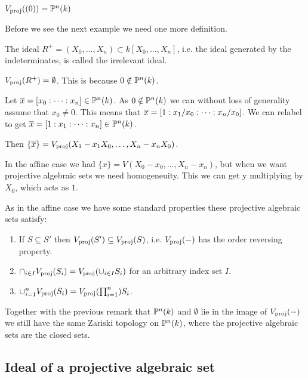 \begin{example}
$\Vp((0)) = \P^n(k)$
\end{example}

Before we see the next example we need one more definition. 

\begin{definition}
The ideal $R^+ = (X_0, \ldots, X_n) \subset k[X_0, \ldots, X_n]$, i.e. the ideal generated by the indeterminates, is called the irrelevant ideal. 
\end{definition}

\begin{example}
$\Vp(R^+) = \emptyset$. This is because $0\notin \P^n(k)$. 
\end{example}

\begin{example}
Let $\x = [x_0:\cdots:x_n] \in \P^n(k)$. As $0\notin \P^n(k)$ we can without loss of generality assume that $x_0 \neq 0$. This means that $\x=[1:x_1/x_0:\cdots:x_n/x_0]$. We can relabel to get $\x=[1:x_1:\cdots:x_n]\in \P^n(k)$. 

Then $\{\x\} = \Vp(X_1-x_1X_0, \ldots, X_n-x_nX_0)$. 
\end{example}

In the affine case we had $\{x\}= V(X_0-x_0, \ldots, X_n-x_n)$, but when we want projective algebraic sets we need homogeneuity. This we can get y multiplying by $X_0$, which acts as $1$. 

As in the affine case we have some standard properties these projective algebraic sets satisfy:
\begin{enumerate}
    \item If $S\subseteq S'$ then $\Vp(S')\subseteq \Vp(S)$, i.e. $\Vp(-)$ has the order reversing property.
    \item $\cap_{i\in I}\Vp(S_i) = \Vp(\cup_{i\in I}S_i)$ for an arbitrary index set $I$.
    \item $\cup_{i=1}^n \Vp(S_i) = \Vp(\prod_{i=1}^n)S_i$.
\end{enumerate}

Together with the previous remark that $\P^n(k)$ and $\emptyset$ lie in the image of $\Vp(-)$ we still have the same Zariski topology on $\P^n(k)$, where the projective algebraic sets are the closed sets. 

\subsection{Ideal of a projective algebraic set}

